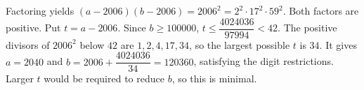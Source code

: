 Factoring yields $(a-2006)(b-2006)=2006^2=2^2\cdot17^2\cdot59^2$. Both factors are positive. Put $t=a-2006$. Since $b\ge100000$, $t\le\dfrac{4024036}{97994}<42$. The positive divisors of $2006^2$ below $42$ are $1,2,4,17,34$, so the largest possible $t$ is $34$. It gives $a=2040$ and $b=2006+\dfrac{4024036}{34}=\boxed{120360}$, satisfying the digit restrictions. Larger $t$ would be required to reduce $b$, so this is minimal.
